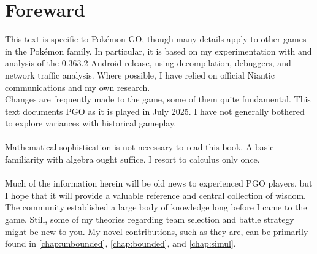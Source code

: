 \chapter{Foreward}

\noindent{}This text is specific to Pokémon GO, though many details
apply to other games in the Pokémon family.
In particular, it is based on my experimentation with and analysis of
 the 0.363.2 Android release, using decompilation, debuggers, and
 network traffic analysis.
Where possible, I have relied on official Niantic communications
 and my own research.
\\
\noindent{}Changes are frequently made to the game, some of them quite fundamental.
This text documents PGO as it is played in July 2025.
I have not generally bothered to explore variances with historical gameplay.\\
\\
\noindent{}Mathematical sophistication is not necessary to read this book.
A basic familiarity with algebra ought suffice.
I resort to calculus only once. \\
\\
\noindent{}Much of the information herein will be old news to experienced
 PGO players, but I hope that it will provide a valuable reference and central collection of wisdom.
The community established a large body of knowledge long before I
 came to the game.
Still, some of my theories regarding team selection and battle strategy might
  be new to you.
My novel contributions, such as they are, can be primarily found in
  \autoref{chap:unbounded}, \autoref{chap:bounded}, and \autoref{chap:simul}.
